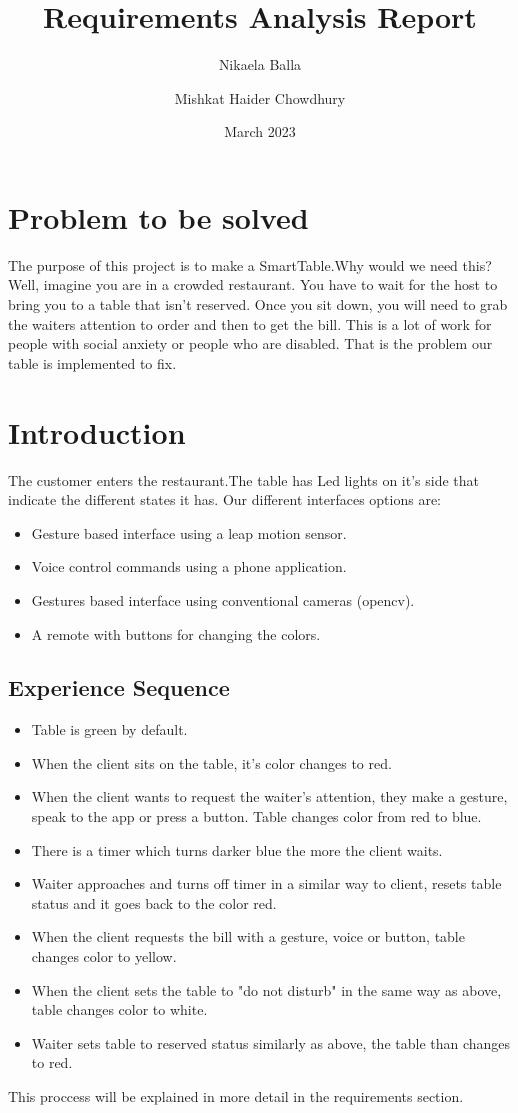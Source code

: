 \documentclass{article}
\title{Requirements Analysis Report}
\author{Nikaela Balla }
\author{Mishkat Haider Chowdhury}
\date{March 2023}
\begin{document}
\maketitle

\section{ Problem to be solved}
\label{sec:problem}
The purpose of this project is to make a SmartTable.Why would we need this? 
Well, imagine you are in a crowded restaurant. You have to wait for the host to bring you to a table that isn't reserved. Once you sit down,
you will need to grab the waiters attention to order and then to get the bill. This is a lot of work for people with social anxiety or people 
who are disabled. That is the problem our table is implemented to fix.
\section{ Introduction}
The customer enters the restaurant.The table has Led lights on it's side that indicate the different states it has. Our different interfaces 
options are: \begin{itemize}
    \item Gesture based interface using a leap motion sensor.
    \item  Voice control commands using a phone application.
    \item  Gestures based interface using conventional cameras (opencv).
    \item A remote with buttons for changing the colors.
\end{itemize}
\subsection{Experience Sequence }
\begin{itemize}
    \item Table is green by default.
    \item  When the client sits on the table, it's color changes to red.
    \item When the client wants to request the waiter's attention, they make a gesture, speak to the app or press a button. 
    Table changes color from  red to blue.
    \item  There is  a timer which turns darker blue the more the client waits.
    \item Waiter approaches and turns off timer in a similar way to client, resets table status and it goes back to the color red.
    \item When the client requests the bill with a gesture, voice or button, table changes color to yellow.
    \item When the client sets the table to "do not disturb" in the same way as above, table changes color to white.
    \item Waiter sets table to reserved status similarly as above, the table than changes to red.
\end{itemize}
This proccess will be explained in more detail in the requirements section.
\end{document}
